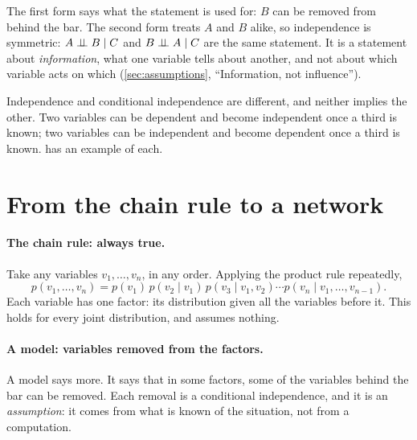The first form says what the statement is used for: $B$ can be removed
from behind the bar. The second form treats $A$ and $B$ alike, so
independence is symmetric: $A\mathrel{\perp\!\!\!\perp} B\mid C$ and $B\mathrel{\perp\!\!\!\perp} A\mid C$ are the
same statement. It is a statement about \emph{information}, what one
variable tells about another, and not about which variable acts on which
(\cref{sec:assumptions}, ``Information, not influence'').

Independence and conditional independence are different, and neither
implies the other. Two variables can be dependent and become independent
once a third is known; two variables can be independent and become
dependent once a third is known.  has an example of each.

\section{From the chain rule to a network}
\label{sec:bn}

\paragraph{The chain rule: always true.} Take any variables
$v_1,\dots,v_n$, in any order. Applying the product rule repeatedly,
\begin{equation}\label{eq:chainrule}
  p(v_1,\dots,v_n)=p(v_1)\,p(v_2\mid v_1)\,p(v_3\mid v_1,v_2)\cdots
  p(v_n\mid v_1,\dots,v_{n-1}).
\end{equation}
Each variable has one factor: its distribution given all the variables
before it. This holds for every joint distribution, and assumes nothing.

\paragraph{A model: variables removed from the factors.} A model says
more. It says that in some factors, some of the variables behind the bar
can be removed. Each removal is a conditional independence, and it is an
\emph{assumption}: it comes from what is known of the situation, not from
a computation.

